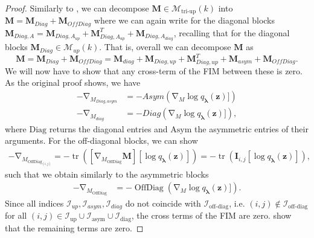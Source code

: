 \documentclass[a4paper, 11pt, oneside]{scrartcl}
\theoremstyle{break}
\DeclareMathOperator{\OffDiag}{OffDiag}
\DeclareMathOperator{\tr}{tr}
\DeclareMathOperator{\grad}{\nabla}
\newcommand{\matr}[1]{\boldsymbol{#1}}
\newcommand{\set}[1]{\mathcal{#1}}
\numberwithin{equation}{section}
\begin{document}
				\begin{proof}
					Similarly to \parencite{LNK+21}, we can decompose $\matr{M} \in \set{M}_{\text{tri-up}} (k)$ into $\matr{M} = \matr{M}_{Diag} + \matr{M}_{OffDiag}$ where we can again write for the diagonal blocks $\matr{M}_{Diag, A} = \matr{M}_{Diag, A_{up}} + \matr{M}_{Diag, A_{up}}^T + \matr{M}_{Diag, A_{diag}}$, recalling that for the diagonal blocks $\matr{M}_{Diag} \in \set{M}_{up} (k)$. 
					That is, overall we can decompose $\matr{M}$ as
					\begin{equation*}
						\matr{M} = \matr{M}_{Diag} + \matr{M}_{OffDiag} = \matr{M}_{diag} + \matr{M}_{Diag, up} + \matr{M}_{Diag, up}^T + \matr{M}_{asym} + \matr{M}_{OffDiag}.
					\end{equation*}
					We will now have to show that any cross-term of the FIM between these is zero. 
					As the original proof shows, we have
					\begin{align*}
						-\grad_{M_{Diag, asym}} &= -Asym (\grad_M \log q_{\matr{\lambda}} (\matr{z})]) \\
						-\grad_{M_{diag}} &= -Diag (\grad_M \log q_{\matr{\lambda}} (\matr{z})]),
					\end{align*}
					where $\text{Diag}$ returns the diagonal entries and $\text{Asym}$ the asymmetric entries of their arguments. 
					For the off-diagonal blocks, we can show
					\begin{align*}
						-\grad_{M_{\OffDiag_{(i, j)}}} = -\tr ([\grad_{M_{\OffDiag}} \matr{M}] [\log q_{\matr{\lambda}} (\matr{z})]) = -\tr (\matr{I}_{i, j} [\log q_{\matr{\lambda}} (\matr{z})]),
					\end{align*}
					such that we obtain similarly to the asymmetric blocks
					\begin{align*}
						-\grad_{M_{\OffDiag}} &= -\OffDiag (\grad_M \log q_{\matr{\lambda}} (\matr{z})]).
					\end{align*}
					Since all indices $\set{I}_{up}, \set{I}_{asym}, \set{I}_{diag}$ do not coincide with $\set{I}_{\text{off-diag}}$, i.e. $(i, j) \notin \set{I}_{\text{off-diag}}$ for all $(i, j) \in \set{I}_{\text{up}} \cup \set{I}_{\text{asym}} \cup \set{I}_{\text{diag}}$, the cross terms of the FIM are zero. 
					\parencite{LNK+21} show that the remaining terms are zero. 


\end{proof}
\end{document}
